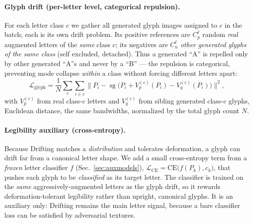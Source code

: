 \documentclass{article}
\newcommand{\sg}{\operatorname{sg}}
\begin{document}
\paragraph{Glyph drift (per-letter level, categorical repulsion).} For each letter class $c$ we gather
all generated glyph images assigned to $c$ in the batch; each is its own drift problem. Its positive
references are $C_p^{\!\ell}$ random \emph{real} augmented letters of the \emph{same} class $c$; its
negatives are $C_n^{\!\ell}$ \emph{other generated glyphs of the same class} (self excluded,
detached). Thus a generated ``A'' is repelled only by other generated ``A''s and never by a ``B'' ---
the repulsion is categorical, preventing mode collapse \emph{within} a class without forcing different
letters apart:
\begin{equation}
   \mathcal{L}_{\mathrm{glyph}} = \frac{1}{N}\sum_{c}\sum_{i\in c}\Big\| P_i-\sg\!\big(P_i+V_p^{(c)}(P_i)-V_q^{(c)}(P_i)\big)\Big\|^2,
\end{equation}
with $V_p^{(c)}$ from real class-$c$ letters and $V_q^{(c)}$ from sibling generated class-$c$ glyphs,
Euclidean distance, the same bandwidths, normalized by the total glyph count $N$.

\paragraph{Legibility auxiliary (cross-entropy).} Because Drifting matches a \emph{distribution} and
tolerates deformation, a glyph can drift far from a canonical letter shape. We add a small
cross-entropy term from a \emph{frozen} letter classifier $f$ (Sec.~\ref{sec:auxmodels}),
$\mathcal{L}_{\mathrm{CE}}=\mathrm{CE}\big(f(P_k),c_k\big)$, that pushes each glyph to be
\emph{classified} as its target letter. The classifier is trained on the \emph{same}
aggressively-augmented letters as the glyph drift, so it rewards deformation-tolerant legibility rather
than upright, canonical glyphs. It is an auxiliary only: Drifting remains the main letter signal,
because a bare classifier loss can be satisfied by adversarial textures.
\end{document}
